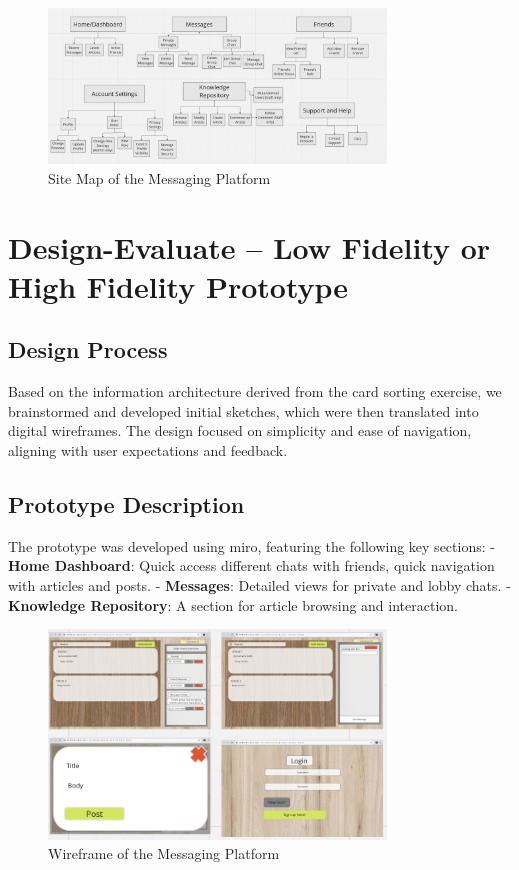 \documentclass[12pt,a4paper]{article}
\begin{document}
\begin{figure}[H]
\centering
\includegraphics[width=0.8\textwidth]{sitemap.png} %
\caption{Site Map of the Messaging Platform}
\label{fig:sitemap}
\end{figure}

\section{Design-Evaluate – Low Fidelity or High Fidelity Prototype }
\subsection*{Design Process}
Based on the information architecture derived from the card sorting exercise, we brainstormed and developed initial sketches, which were then translated into digital wireframes. The design focused on simplicity and ease of navigation, aligning with user expectations and feedback.

\subsection*{Prototype Description}
The prototype was developed using miro, featuring the following key sections:
- \textbf{Home Dashboard}: Quick access different chats with friends, quick navigation with articles and posts.
- \textbf{Messages}: Detailed views for private and lobby chats.
- \textbf{Knowledge Repository}: A section for article browsing and interaction.

\begin{figure}[H]
\centering
\includegraphics[width=0.8\textwidth]{wireframe.png}
\caption{Wireframe of the Messaging Platform}
\label{fig:wireframe}
\end{figure}
\end{document}

